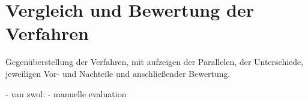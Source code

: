 \section{Vergleich und Bewertung der Verfahren} %
\label{sec:vergleich_und_bewertung_der_verfahren}
Gegenüberstellung der Verfahren, mit aufzeigen der Parallelen, der Unterschiede, jeweiligen Vor- und Nachteile und anschließender Bewertung.


- van zwol: 
 - manuelle evaluation


